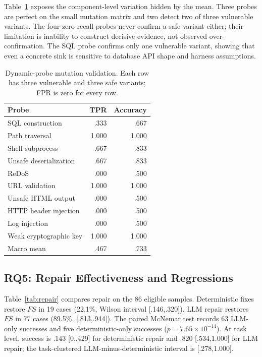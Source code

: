 \documentclass[sigconf,nonacm]{acmart}
\begin{document}
Table~\ref{tab:probes} exposes the component-level variation hidden by the
mean. Three probes are perfect on the small mutation matrix and two detect two
of three vulnerable variants. The four zero-recall probes never confirm a safe
variant either; their limitation is inability to construct decisive evidence,
not observed over-confirmation. The SQL probe confirms only one vulnerable
variant, showing that even a concrete sink is sensitive to database API shape
and harness assumptions.

\begin{table}[t]
\caption{Dynamic-probe mutation validation. Each row has three vulnerable and
three safe variants; FPR is zero for every row.}
\label{tab:probes}
\centering
\small
\begin{tabular}{lrr}
\toprule
Probe & TPR & Accuracy \\
\midrule
SQL construction & .333 & .667 \\
Path traversal & 1.000 & 1.000 \\
Shell subprocess & .667 & .833 \\
Unsafe deserialization & .667 & .833 \\
ReDoS & .000 & .500 \\
URL validation & 1.000 & 1.000 \\
Unsafe HTML output & .000 & .500 \\
HTTP header injection & .000 & .500 \\
Log injection & .000 & .500 \\
Weak cryptographic key & 1.000 & 1.000 \\
\midrule
Macro mean & .467 & .733 \\
\bottomrule
\end{tabular}
\end{table}

\subsection{RQ5: Repair Effectiveness and Regressions}

Table~\ref{tab:repair} compares repair on the 86 eligible samples. Deterministic
fixes restore $FS$ in 19 cases (22.1\%, Wilson interval [.146,.320]). LLM repair
restores $FS$ in 77 cases (89.5\%, [.813,.944]). The paired McNemar test records
63 LLM-only successes and five deterministic-only successes
($p=7.65\times10^{-14}$). At task level, success is .143 [0,.429] for
deterministic repair and .820 [.534,1.000] for LLM repair; the task-clustered
LLM-minus-deterministic interval is [.278,1.000].
\end{document}
